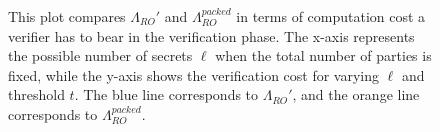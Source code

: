 \begin{figure}[t!]
  \centering
  \caption{This plot compares $\Lambda_{RO}'$ and $\Lambda_{RO}^{packed}$ in terms of computation cost  
  a verifier has to bear in the verification phase. 
  The x-axis represents the possible number of secrets $\ell$ when the total number of parties 
  is fixed, while the y-axis shows the verification cost for varying $\ell$ and threshold $t$. 
  The blue line corresponds to $\Lambda_{RO}'$, and the orange line corresponds to $\Lambda_{RO}^{packed}$.}
  \label{fig:3pvss_verify_cost}
\end{figure}